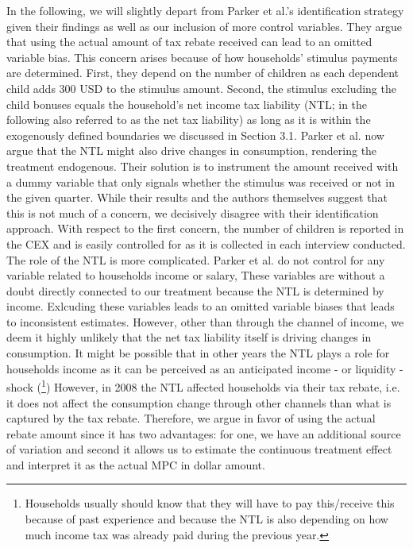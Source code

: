 In the following, we will slightly depart from Parker et al.'s identification strategy given their findings as well as our inclusion of more control variables. They argue that using the actual amount of tax rebate received can lead to an omitted variable bias. This concern arises because of how households' stimulus payments are determined. First, they depend on the number of children as each dependent child adds 300 USD to the stimulus amount. Second, the stimulus excluding the child bonuses equals the household's net income tax liability (NTL; in the following also referred to as the net tax liability) as long as it is within the exogenously defined boundaries we discussed in Section 3.1. Parker et al. now argue that the NTL might also drive changes in consumption, rendering the treatment endogenous. Their solution is to instrument the amount received with a dummy variable that only signals whether the stimulus was received or not in the given quarter. While their results and the authors themselves suggest that this is not much of a concern, we decisively disagree with their identification approach. With respect to the first concern, the number of children is reported in the CEX and is easily controlled for as it is collected in each interview conducted. The role of the NTL is more complicated. Parker et al. do not control for any variable related to households income or salary, These variables are without a doubt directly connected to our treatment because the NTL is determined by income. Exlcuding these variables leads to an omitted variable biases that leads to inconsistent estimates. However, other than through the channel of income, we deem it highly unlikely that the net tax liability itself is driving changes in consumption. It might be possible that in other years the NTL plays a role for households income as it can be perceived as an anticipated income - or liquidity - shock (\footnote{Households usually should know that they will have to pay this/receive this because of past experience and because the NTL is also depending on how much income tax was already paid during the previous year.}) However, in 2008 the NTL affected households via their tax rebate, i.e. it does not affect the consumption change through other channels than what is captured by the tax rebate. Therefore, we argue in favor of using the actual rebate amount since it has two advantages: for one, we have an additional source of variation and second it allows us to estimate the continuous treatment effect and interpret it as the actual MPC in dollar amount. \\
